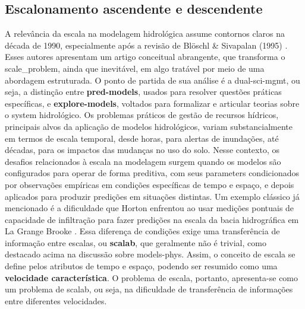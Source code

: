 \documentclass[./main.tex]{subfiles}
\begin{document}
\subsection{Escalonamento ascendente e descendente}

\par A relevância da escala na modelagem hidrológica assume contornos claros na década de 1990, especialmente após a revisão de Blöschl \& Sivapalan (1995) \cite{Bloschl1995a}. Esses autores apresentam um artigo conceitual abrangente, que transforma o \gls{scale_problem}, ainda que inevitável, em algo tratável por meio de uma abordagem estruturada. O ponto de partida de sua análise é a \gls{dual-sci-mgmt}, ou seja, a distinção entre \textbf{\gls{pred-models}}, usados para resolver questões práticas específicas, e \textbf{\gls{explore-models}}, voltados para formalizar e articular teorias sobre o \gls{system} hidrológico. Os problemas práticos de gestão de recursos hídricos, principais alvos da aplicação de modelos hidrológicos, variam substancialmente em termos de escala temporal, desde horas, para alertas de inundações, até décadas, para os impactos das mudanças no uso do solo. Nesse contexto, os desafios relacionados à escala na modelagem surgem quando os modelos são configurados para operar de forma preditiva, com seus \gls{parameters} condicionados por observações empíricas em condições específicas de tempo e espaço, e depois aplicados para produzir predições em situações distintas. Um exemplo clássico já mencionado é a dificuldade que Horton enfrentou ao usar medições pontuais de capacidade de infiltração para fazer predições na escala da bacia hidrográfica em La Grange Brooke \cite{Beven2004c}. Essa diferença de condições exige uma transferência de informação entre escalas, ou \textbf{\gls{scalab}}, que geralmente não é trivial, como destacado acima na discussão sobre \gls{models-phys}. Assim, o conceito de escala se define pelos atributos de tempo e espaço, podendo ser resumido como uma \textbf{velocidade característica}. O problema de escala, portanto, apresenta-se como um problema de \gls{scalab}, ou seja, na dificuldade de transferência de informações entre diferentes velocidades.
\end{document}
